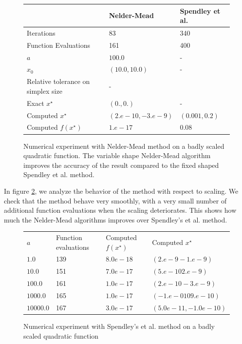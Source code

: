 \begin{figure}[h]
\begin{center}
\begin{tabular}{|l|l|l|}
\hline
& Nelder-Mead & Spendley et al.\\
\hline
Iterations & 83  & 340 \\
Function Evaluations & 161 & 400 \\
$a$ & $100.0$ & - \\
$x_0$ & $(10.0,10.0)$ & - \\
Relative tolerance on simplex size & - \\
Exact $x^\star$ & $(0.,0.)$ & -\\
Computed $x^\star$ & $(2.e-10, -3.e-9)$& $(0.001,0.2)$\\
Computed $f(x^\star)$ & $1.e-17$ & $0.08$\\
\hline
\end{tabular}
\end{center}
\caption{Numerical experiment with Nelder-Mead method on a badly scaled quadratic function.
The variable shape Nelder-Mead algorithm improves the accuracy of the result compared
to the fixed shaped Spendley et al. method.}
\label{fig-nm-numexp2-table}
\end{figure}

In figure \ref{fig-nm-numexp2-scaling}, we analyze the 
behavior of the method with respect to scaling.
We check that the method behave very smoothly, with a very 
small number of additional function evaluations when the 
scaling deteriorates. This shows how much the Nelder-Mead algorithms 
improves over Spendley's et al. method.

\begin{figure}[htbp]
\begin{center}
\begin{tabular}{|l|l|l|l|}
\hline
$a$ & Function evaluations & Computed $f(x^\star)$ & Computed $x^\star$\\
$1.0$ & 139 & $8.0e-18$ & $(2.e-9 -1.e-9)$\\
$10.0$ & 151 & $7.0e-17$ & $(5.e-10 2.e-9)$\\
$100.0$ & 161 & $1.0e-17$ & $(2.e-10 -3.e-9)$ \\
$1000.0$ & 165 & $1.0e-17$ & $(-1.e-010 9.e-10)$\\
$10000.0$ & 167 & $3.0e-17$ & $(5.0e-11,-1.0e-10)$ \\
\hline
\end{tabular}
\end{center}
\caption{Numerical experiment with Spendley's et al. method on a badly scaled quadratic function}
\label{fig-nm-numexp2-scaling}
\end{figure}

